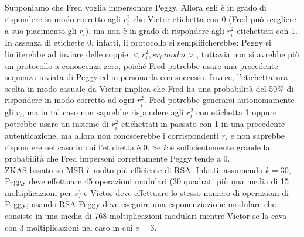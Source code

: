 Supponiamo che Fred voglia impersonare Peggy. Allora egli è in grado di rispondere in modo corretto agli $r_{i}^2$ che Victor etichetta con 0 (Fred può scegliere a suo piacimento gli $r_{i}$), ma non è in grado di rispondere agli $r_{i}^2$ etichettati con 1. In assenza di etichette 0, infatti, il protocollo si semplificherebbe: Peggy si limiterebbe ad inviare delle coppie $<r_{i}^2, sr_{i} \, mod \, n>$, tuttavia non si avrebbe più un protocollo a conoscenza zero, poiché Fred potrebbe usare una precedente sequenza inviata di Peggy ed impersonarla con successo. Invece, l'etichettatura scelta in modo casuale da Victor implica che Fred ha una probabilità del 50\% di
rispondere in modo corretto ad ogni $r_{i}^2$. Fred potrebbe generarsi autonomamente gli $r_{i}$, ma in tal caso non saprebbe rispondere agli $r_{i}^2$ con etichetta 1 oppure potrebbe usare un insieme di $r_{i}^2$ etichettati in passato con 1 in una precedente autenticazione, ma allora non conoscerebbe i corrispondenti $r_{i}$ e non saprebbe rispondere nel caso in cui l'etichetta è 0. Se $k$ è sufficientemente grande la probabilità che Fred impersoni correttamente Peggy tende a 0. \\
ZKAS basato su MSR è molto più efficiente di RSA. Infatti, assumendo $k = 30$, Peggy deve effettuare 45 operazioni modulari (30 quadrati più una media di 15 moltiplicazioni per $s$) e Victor deve effettuare lo stesso numero di operazioni di Peggy; usando RSA Peggy deve eseguire una esponenziazione modulare che consiste in una media di 768 moltiplicazioni modulari mentre Victor se la cava con 3 moltiplicazioni nel caso in cui $e = 3$.
